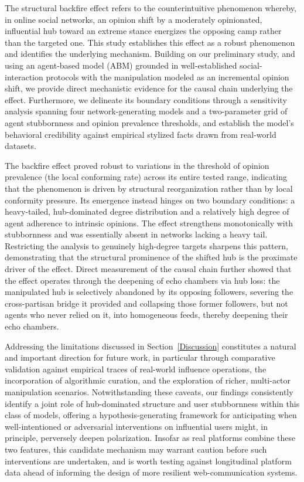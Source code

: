 \documentclass[pdflatex,sn-mathphys-num]{sn-jnl}%
\theoremstyle{thmstyleone}%
\theoremstyle{thmstyletwo}%
\theoremstyle{thmstylethree}%
\begin{document}
The structural backfire effect refers to the counterintuitive phenomenon whereby, in online
social networks,
an opinion shift by a moderately opinionated, influential hub toward an extreme
stance energizes the opposing camp rather than the targeted one. This study
establishes this effect as a robust phenomenon and identifies the underlying mechanism.
Building on our
preliminary study, and using an agent-based model (ABM) grounded in well-established
social-interaction protocols with the manipulation modeled as an incremental opinion shift,
we provide
direct mechanistic evidence for the causal chain underlying the effect. Furthermore, we delineate
its boundary conditions through a sensitivity analysis spanning four
network-generating models and a two-parameter grid of agent stubbornness and
opinion prevalence thresholds, and establish the model's behavioral credibility
against empirical stylized facts drawn from real-world datasets.
\par


The backfire effect proved robust to variations in the threshold of opinion prevalence (the
local conforming rate) across its entire tested range, indicating that the
phenomenon is driven by structural reorganization rather than by local conformity
pressure. Its emergence instead hinges on two boundary conditions: a heavy-tailed,
hub-dominated degree distribution and a relatively high degree of agent adherence to
intrinsic opinions. The effect strengthens monotonically with stubbornness and
was essentially absent in networks lacking a heavy tail.
Restricting the analysis to genuinely high-degree targets
sharpens this pattern, demonstrating that the structural prominence of the shifted
hub is the proximate driver of the effect. Direct measurement of the causal chain further showed
that the effect operates through the deepening of echo chambers via hub loss: the
manipulated hub is selectively abandoned by its opposing followers, severing the
cross-partisan bridge it provided and collapsing those former followers, but not
agents who never relied on it, into homogeneous feeds, thereby deepening their echo chambers.
\par


Addressing the limitations discussed in Section~\ref{Discussion} constitutes a natural and important direction for
future work, in particular through comparative validation against empirical traces
of real-world influence operations, the incorporation of algorithmic curation, and
the exploration of richer, multi-actor manipulation scenarios. Notwithstanding these caveats, our
findings consistently identify a joint role of hub-dominated structure and user
stubbornness within this class of models, offering a hypothesis-generating
framework for anticipating when well-intentioned or adversarial interventions
on influential users might, in principle, perversely deepen polarization.
Insofar as real platforms combine these two features, this candidate mechanism
may warrant caution before such interventions are undertaken, and is worth
testing against longitudinal platform data ahead of informing the design of
more resilient web-communication systems.
\par
\end{document}
